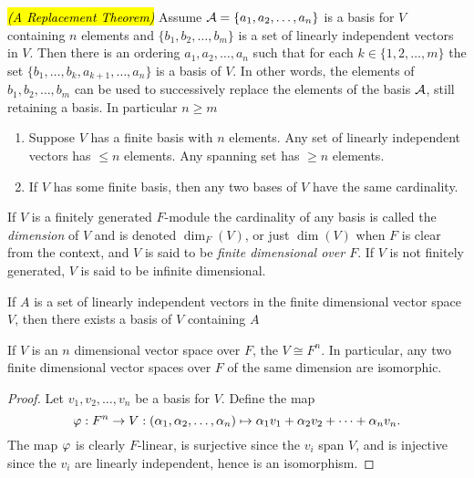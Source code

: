 \nl

\begin{thm}\hl{\textit{(A Replacement Theorem)}}
Assume $\mathcal{A} = \{a_1,a_2,\ldots,a_n\}$ is a basis for $V$ containing $n$ elements and $\{b_1,b_2,\ldots, b_m\}$ is a set of linearly independent vectors in $V$. Then there is an ordering $a_1,a_2,\ldots,a_n$ such that for each $k\in\{1,2,\ldots,m\}$ the set $\{b_1,\ldots, b_k, a_{k+1}, \ldots, a_n\}$ is a basis of $V$. In other words, the elements of $b_1,b_2,\ldots, b_m$ can be used to successively replace the elements of the basis $\mathcal{A}$, still retaining a basis. In particular $n\geq m$
\end{thm}

\nl

\begin{cor}\nl
\begin{enumerate}
\item Suppose $V$ has a finite basis with $n$ elements. Any set of linearly independent vectors has $\leq n$ elements. Any spanning set has $\geq n$ elements.
\item If $V$ has some finite basis, then any two bases of $V$ have the same cardinality.
\end{enumerate}
\end{cor}

\nl

\begin{defn}
If $V$ is a finitely generated $F$-module the cardinality of any basis is called the \textit{dimension} of $V$ and is denoted $\dim_F(V)$, or just $\dim(V)$ when $F$ is clear from the context, and $V$ is said to be \textit{finite dimensional over $F$}. If $V$ is not finitely generated, $V$ is said to be infinite dimensional.
\end{defn}

\nl

\begin{cor}
If $A$ is a set of linearly independent vectors in the finite dimensional vector space $V$, then there exists a basis of $V$ containing $A$
\end{cor}

\nl

\begin{thm}
If $V$ is an $n$ dimensional vector space over $F$, the $V\cong F^n$. In particular, any two finite dimensional vector spaces over $F$ of the same dimension are isomorphic.
\end{thm}

\begin{proof}
Let $v_1,v_2,\ldots,v_n$ be a basis for $V$. Define the map 
\[\varphi:F^n\rightarrow V:(\alpha_1,\alpha_2,\ldots,\alpha_n)\mapsto\alpha_1v_1 + \alpha_2v_2+\cdots+\alpha_n v_n.\]
The map $\varphi$ is clearly $F$-linear, is surjective since the $v_i$ span $V$, and is injective since the $v_i$ are linearly independent, hence is an isomorphism.
\end{proof}

